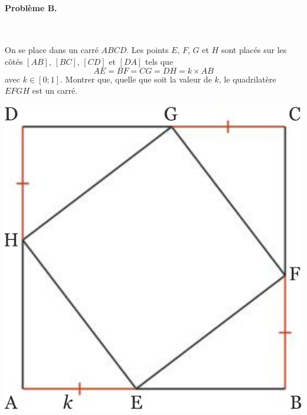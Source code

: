 \documentclass[11pt]{article}
\begin{document}
\paragraph{Problème B.}~\\
\begin{minipage}[]{.6\textwidth}
  On se place dans un carré $ABCD$. Les points $E$, $F$, $G$ et $H$ sont placés
  sur les côtés $\left[ AB \right]$, $\left[ BC \right]$, $\left[ CD
  \right]$ et $\left[ DA \right]$ tels que
  \[
    AE = BF = CG = DH = k\times AB
  \]
  avec $k\in\left[ 0;1 \right]$. Montrer que, quelle que soit la valeur de $k$,
  le quadrilatère $EFGH$ est un carré.
\end{minipage}
\begin{minipage}[]{.4\textwidth}
  \begin{center}
    \includegraphics[scale=.3]{pb2.png}
  \end{center}
\end{minipage}
\end{document}
